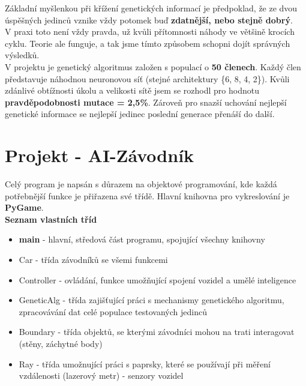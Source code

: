 \documentclass[a4paper,12pt]{article}
\newcommand{\tab}
{
    \hspace*{1em}
}
\begin{document}
        \vspace{0.75cm}
        Základní myšlenkou při křížení genetických informací je předpoklad, že ze dvou úspěšných
        jedinců vznike vždy potomek buď \textbf{zdatnější, nebo stejně dobrý}.\\
        V praxi toto není vždy pravda, už kvůli přítomnosti náhody ve většině krocích cyklu. 
        Teorie ale funguje, a tak jsme tímto způsobem schopni dojít správných výsledků.
        \\

        V projektu je genetický algoritmus založen s populací o \textbf{50 členech}. 
        Každý člen představuje náhodnou neuronovou síť (stejné architektury \{6, 8, 4, 2\}).
        Kvůli zdánlivé obtížnosti úkolu a velikosti sítě jsem se rozhodl pro hodnotu 
        \textbf{pravděpodobnosti mutace = 2,5\%}. Zároveň pro snazší uchování nejlepší 
        genetické informace se nejlepší jedinec poslední generace přenáší do další.

    \pagebreak
    \section{Projekt - AI-Závodník}
        \tab Celý program je napsán s důrazem na objektové programování, kde každá potřebnější funkce 
        je přiřazena své třídě. Hlavní knihovna pro vykreslování je \textbf{PyGame}.
        \\

        \textbf{Seznam vlastních tříd}
        \begin{itemize}[noitemsep]
            \vspace{-0.5em}
            \item \textbf{main} - hlavní, středová část programu, spojující všechny knihovny
            \item Car - třída závodníků se všemi funkcemi
            \item Controller - ovládání, funkce umožňující spojení vozidel a umělé inteligence
            \item GeneticAlg - třída zajišťující práci s mechanismy genetického algoritmu,
                zpracovávání dat celé populace testovaných jedinců
            \item Boundary - třída objektů, se kterými závodníci mohou na trati interagovat (stěny, záchytné body)
            \item Ray - třída umožnující práci s paprsky, které se používají při měření vzdálenosti
                (lazerový metr) - senzory vozidel
        \end{itemize}
\end{document}
